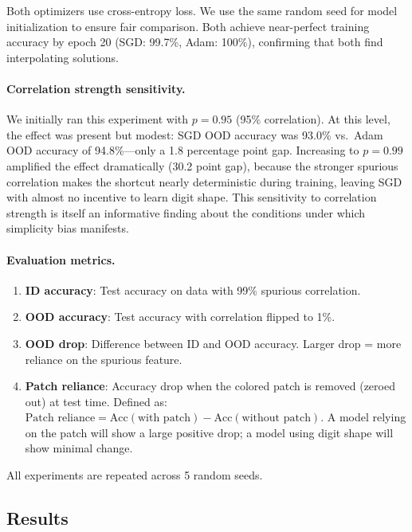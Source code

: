 \documentclass{article}
\begin{document}
Both optimizers use cross-entropy loss. We use the same random seed for model initialization to ensure fair comparison. Both achieve near-perfect training accuracy by epoch 20 (SGD: 99.7\%, Adam: 100\%), confirming that both find interpolating solutions.

\paragraph{Correlation strength sensitivity.} We initially ran this experiment with $p = 0.95$ (95\% correlation). At this level, the effect was present but modest: SGD OOD accuracy was 93.0\% vs.\ Adam OOD accuracy of 94.8\%---only a 1.8 percentage point gap. Increasing to $p = 0.99$ amplified the effect dramatically (30.2 point gap), because the stronger spurious correlation makes the shortcut nearly deterministic during training, leaving SGD with almost no incentive to learn digit shape. This sensitivity to correlation strength is itself an informative finding about the conditions under which simplicity bias manifests.

\paragraph{Evaluation metrics.}
\begin{enumerate}[leftmargin=*]
    \item \textbf{ID accuracy}: Test accuracy on data with 99\% spurious correlation.
    \item \textbf{OOD accuracy}: Test accuracy with correlation flipped to 1\%.
    \item \textbf{OOD drop}: Difference between ID and OOD accuracy. Larger drop = more reliance on the spurious feature.
    \item \textbf{Patch reliance}: Accuracy drop when the colored patch is removed (zeroed out) at test time. Defined as: $\text{Patch reliance} = \text{Acc}(\text{with patch}) - \text{Acc}(\text{without patch})$. A model relying on the patch will show a large positive drop; a model using digit shape will show minimal change.
\end{enumerate}

All experiments are repeated across 5 random seeds.

\subsection{Results}
\end{document}
